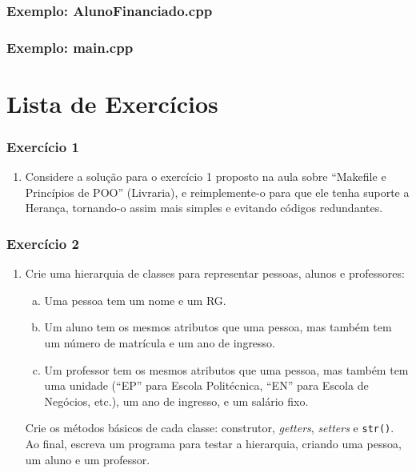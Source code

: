\documentclass[aspectratio=169]{beamer}
\newcommand\setItemnumber[1]{\setcounter{enumi}{\numexpr#1-1\relax}}
\begin{document}
\begin{frame}[fragile]\frametitle{Exemplo: AlunoFinanciado.cpp}

\end{frame}

\begin{frame}[fragile]\frametitle{Exemplo: main.cpp}

\end{frame}

\section{Lista de Exercícios}

\begin{frame}[fragile]\frametitle{Exercício 1}
\begin{enumerate}
	\setItemnumber{1}
	\item Considere a solução para o exercício 1 proposto na aula sobre ``Makefile e Princípios de POO'' (Livraria), e reimplemente-o para que ele tenha suporte a Herança, tornando-o assim mais simples e evitando códigos redundantes.
\end{enumerate}
\end{frame}

\begin{frame}[fragile]\frametitle{Exercício 2}
\begin{enumerate}
	\setItemnumber{2}
	\item Crie uma hierarquia de classes para representar pessoas, alunos e professores:
	\begin{enumerate}[a.]
		\item Uma pessoa tem um nome e um RG.
		\item Um aluno tem os mesmos atributos que uma pessoa, mas também tem um número de matrícula e um ano de ingresso.
		\item Um professor tem os mesmos atributos que uma pessoa, mas também tem uma unidade (``EP'' para Escola Politécnica, ``EN'' para Escola de Negócios, etc.), um ano de ingresso, e um salário fixo.
	\end{enumerate}
	Crie os métodos básicos de cada classe: construtor, \emph{getters}, \emph{setters} e \texttt{str()}.\\
	Ao final, escreva um programa para testar a hierarquia, criando uma pessoa, um aluno e um professor.
\end{enumerate}
\end{frame}
\end{document}
